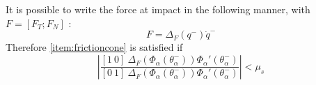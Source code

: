 It is possible to write the force at impact in the following manner, with $F = [F_T;F_N]$ \cite{westervelt2007feedback}:
\[ F = \Delta_{F}(q^-)\dot{q}^- \]
Therefore \ref{item:frictioncone} is satisfied if 
\begin{equation}
	\left\lvert\frac{[1~0]~\Delta_F(\Phi_\alpha\left(\theta_\alpha^-\right)) \Phi_\alpha'\left(\theta_\alpha^-\right)}
		{[0~1]~\Delta_F(\Phi_\alpha\left(\theta_\alpha^-\right)) \Phi_\alpha'\left(\theta_\alpha^-\right)}\right\rvert
		< \mu_s
\end{equation}